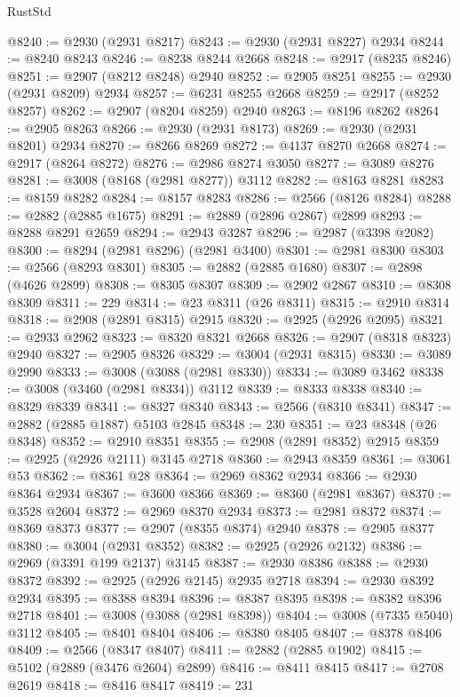\begin{lexlean}{RustStd}
\begin{coremodule}
@8240 := @2930 (@2931 @8217)
@8243 := @2930 (@2931 @8227) @2934
@8244 := @8240 @8243
@8246 := @8238 @8244 @2668
@8248 := @2917 (@8235 @8246)
@8251 := @2907 (@8212 @8248) @2940
@8252 := @2905 @8251
@8255 := @2930 (@2931 @8209) @2934
@8257 := @6231 @8255 @2668
@8259 := @2917 (@8252 @8257)
@8262 := @2907 (@8204 @8259) @2940
@8263 := @8196 @8262
@8264 := @2905 @8263
@8266 := @2930 (@2931 @8173)
@8269 := @2930 (@2931 @8201) @2934
@8270 := @8266 @8269
@8272 := @4137 @8270 @2668
@8274 := @2917 (@8264 @8272)
@8276 := @2986 @8274 @3050
@8277 := @3089 @8276
@8281 := @3008 (@8168 (@2981 @8277)) @3112
@8282 := @8163 @8281
@8283 := @8159 @8282
@8284 := @8157 @8283
@8286 := @2566 (@8126 @8284)
@8288 := @2882 (@2885 @1675)
@8291 := @2889 (@2896 @2867) @2899
@8293 := @8288 @8291 @2659
@8294 := @2943 @3287
@8296 := @2987 (@3398 @2082)
@8300 := @8294 (@2981 @8296) (@2981 @3400)
@8301 := @2981 @8300
@8303 := @2566 (@8293 @8301)
@8305 := @2882 (@2885 @1680)
@8307 := @2898 (@4626 @2899)
@8308 := @8305 @8307
@8309 := @2902 @2867
@8310 := @8308 @8309
@8311 := 229
@8314 := @23 @8311 (@26 @8311)
@8315 := @2910 @8314
@8318 := @2908 (@2891 @8315) @2915
@8320 := @2925 (@2926 @2095)
@8321 := @2933 @2962
@8323 := @8320 @8321 @2668
@8326 := @2907 (@8318 @8323) @2940
@8327 := @2905 @8326
@8329 := @3004 (@2931 @8315)
@8330 := @3089 @2990
@8333 := @3008 (@3088 (@2981 @8330))
@8334 := @3089 @3462
@8338 := @3008 (@3460 (@2981 @8334)) @3112
@8339 := @8333 @8338
@8340 := @8329 @8339
@8341 := @8327 @8340
@8343 := @2566 (@8310 @8341)
@8347 := @2882 (@2885 @1887) @5103 @2845
@8348 := 230
@8351 := @23 @8348 (@26 @8348)
@8352 := @2910 @8351
@8355 := @2908 (@2891 @8352) @2915
@8359 := @2925 (@2926 @2111) @3145 @2718
@8360 := @2943 @8359
@8361 := @3061 @53
@8362 := @8361 @28
@8364 := @2969 @8362 @2934
@8366 := @2930 @8364 @2934
@8367 := @3600 @8366
@8369 := @8360 (@2981 @8367)
@8370 := @3528 @2604
@8372 := @2969 @8370 @2934
@8373 := @2981 @8372
@8374 := @8369 @8373
@8377 := @2907 (@8355 @8374) @2940
@8378 := @2905 @8377
@8380 := @3004 (@2931 @8352)
@8382 := @2925 (@2926 @2132)
@8386 := @2969 (@3391 @199 @2137) @3145
@8387 := @2930 @8386
@8388 := @2930 @8372
@8392 := @2925 (@2926 @2145) @2935 @2718
@8394 := @2930 @8392 @2934
@8395 := @8388 @8394
@8396 := @8387 @8395
@8398 := @8382 @8396 @2718
@8401 := @3008 (@3088 (@2981 @8398))
@8404 := @3008 (@7335 @5040) @3112
@8405 := @8401 @8404
@8406 := @8380 @8405
@8407 := @8378 @8406
@8409 := @2566 (@8347 @8407)
@8411 := @2882 (@2885 @1902)
@8415 := @5102 (@2889 (@3476 @2604) @2899)
@8416 := @8411 @8415
@8417 := @2708 @2619
@8418 := @8416 @8417
@8419 := 231

\end{coremodule}
\end{lexlean}
